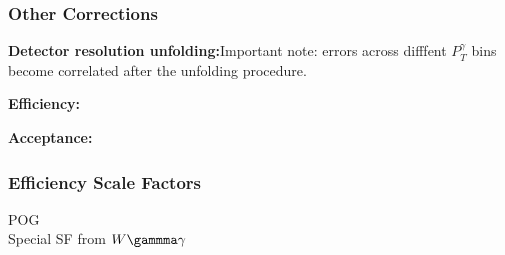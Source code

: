 \begin{frame}\frametitle{Other Corrections}

\footnotesize{\bfseries{Detector resolution unfolding:}}\scriptsize{Important note: errors across difffent $P_T^{\gamma}$ bins become correlated after the unfolding procedure.}

\footnotesize{\bfseries{Efficiency:}}\scriptsize{}

\footnotesize{\bfseries{Acceptance:}}\scriptsize{}

\end{frame}%

\begin{frame}\frametitle{Efficiency Scale Factors}
  POG \\
  Special SF from $W\gammma\gamma$
\end{frame}%
